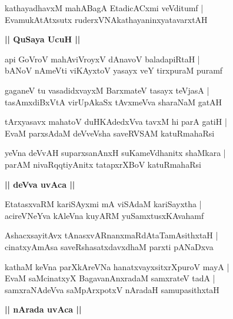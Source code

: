 \documentclass[twoside,12pt,openright]{book}
\newcounter{shloka}[chapter]
\def\uvaca#1{\centerline{{\large\textbf{#1}}}}
\begin{document}
\begin{shloka}
kathayadhavxM mahABagA EtadicACxmi veVditumf |\\
EvamukAtAtxsutx ruderxVNAkathayaninxyatavarxtAH
\end{shloka}

\uvaca{|| QuSaya UcuH ||}

\begin{shloka}
api GoVroV mahAviVroyxV dAnavoV baladapiRtaH |\\
bANoV nAmeVti viKAyxtoV yasayx veY tirxpuraM puramf
\end{shloka}

\begin{shloka}
gaganeV tu vasadidxvayxM BarxmateV tasayx teVjasA |\\
tasAmxdiBxVtA virUpAkaSx tAvxmeVva sharaNaM gatAH
\end{shloka}

\begin{shloka}
tArxyasavx mahatoV duHKAdedxVva tavxM hi parA gatiH |\\
EvaM parxsAdaM deVveVsha saveRVSAM katuRmahaRsi
\end{shloka}

\begin{shloka}
yeVna deVvAH suparxsanAnxH suKameVdhanitx shaMkara |\\
parAM nivaRqqtiyAnitx tatapxrXBoV katuRmahaRsi
\end{shloka}

\uvaca{|| deVva uvAca ||}

\begin{shloka}
EtatasxvaRM kariSAyxmi mA viSAdaM kariSayxtha |\\
acireVNeYva kAleVna kuyARM yuSamxtusxKAvahamf 
\end{shloka}

\begin{shloka}
AshacxsayitAvx tAnasxvARnanxmaRdAtaTamAsithxtaH |\\
cinatxyAmAsa saveRshasatxdavxdhaM parxti pANaDxva
\end{shloka}

\begin{shloka}
kathaM keVna parXkAreVNa hanatxvayxsitxrXpuroV mayA |\\
EvaM saMcinatxyX BagavanAnxradaM samxrateV tadA |\\
samxraNAdeVva saMpArxpotxV nAradaH samupasithxtaH
\end{shloka}


\uvaca{|| nArada uvAca ||}
\end{document}
